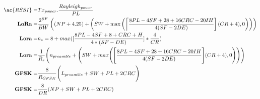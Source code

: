 \begin{align}
\ac{RSSI} = & Tx_{power}.\frac{Rayleigh_{power}}{PL}\\
\textbf{LoRa}=                                       & \frac{2^{S F}}{B W}\left((N P+4.25)+\left(S W+\max \left(\left\lceil\frac{8 P L-4 S F+28+16 C R C-20 I H}{4(S F-2 D E)}\right](C R+4), 0\right)\right)\right)\\
\textbf{Lora}=                                       & n_{s}=8+max([\frac{8PL-4SF+8+CRC+H}{4*(SF-DE)}]*\frac{4}{CR})\\
\textbf{Lora}=                                       & \frac{1}{R_{s}} \Bigg(n_{preamble} + \Bigg(SW + max\Bigg(\Bigg[\frac{8PL - 4SF + 28 + 16CRC -20IH}{4(SF-2DE)}\Bigg](CR+4),0\Bigg)\Bigg)\Bigg)\\
\textbf{GFSK}=                                       & \frac{8}{R_{GFSK}}\Bigg(L_{preamble} + SW + PL + 2CRC\Bigg)\\
\textbf{GFSK}=                                       & \frac{8}{D R}(N P+S W+P L+2 C R C)\\
\end{align}



